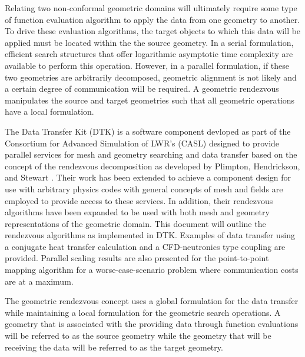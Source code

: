 \documentclass{mc2013}
\begin{document}
Relating two non-conformal geometric domains will ultimately require
some type of function evaluation algorithm to apply the data from one
geometry to another. To drive these evaluation algorithms, the target
objects to which this data will be applied must be located within the
the source geometry. In a serial formulation, efficient search
structures that offer logarithmic asymptotic time complexity are
available to perform this operation. However, in a parallel
formulation, if these two geometries are arbitrarily decomposed,
geometric alignment is not likely and a certain degree of
communication will be required. A geometric rendezvous manipulates the
source and target geometries such that all geometric operations have a
local formulation.

The Data Transfer Kit (DTK) is a software component devloped as part
of the Consortium for Advanced Simulation of LWR's (CASL)
\cite{u.s._department_of_energy_casl_2011} designed to provide
parallel services for mesh and geometry searching and data transfer
based on the concept of the rendezvous decomposition as developed by
Plimpton, Hendrickson, and Stewart \cite{Plimpton_2004}. Their work
has been extended to achieve a component design for use with arbitrary
physics codes with general concepts of mesh and fields are employed to
provide access to these services. In addition, their rendezvous
algorithms have been expanded to be used with both mesh and geometry
representations of the geometric domain. This document will outline
the rendezvous algorithms as implemented in DTK. Examples of data
transfer using a conjugate heat transfer calculation and a
CFD-neutronics type coupling are provided. Parallel scaling results
are also presented for the point-to-point mapping algorithm for a
worse-case-scenario problem where communication costs are at a
maximum.


\label{sec:rendezvous_algorithms}

The geometric rendezvous concept uses a global formulation for the
data transfer while maintaining a local formulation for the geometric
search operations. A geometry that is associated with the providing
data through function evaluations will be referred to as the source
geometry while the geometry that will be receiving the data will be
referred to as the target geometry. 
\end{document}
